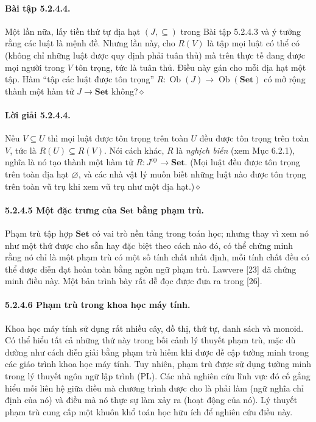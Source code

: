 \paragraph{Bài tập 5.2.4.4.} Một lần nữa, lấy tiền thứ tự địa hạt $(J,\subseteq)$ trong Bài tập 5.2.4.3 và ý tưởng rằng các luật là mệnh đề. Nhưng lần này, cho $R(V)$ là tập mọi luật có thể có (không chỉ những luật được quy định phải tuân thủ) mà trên thực tế đang được mọi người trong $V$ tôn trọng, tức là tuân thủ. Điều này gán cho mỗi địa hạt một tập. Hàm ``tập các luật được tôn trọng'' $R:\operatorname{Ob}(J)\to\operatorname{Ob}(\mathbf{Set})$ có mở rộng thành một hàm tử $J\to\mathbf{Set}$ không?\hfill$\diamond$
\paragraph{Lời giải 5.2.4.4.} Nếu $V\subseteq U$ thì mọi luật được tôn trọng trên toàn $U$ đều được tôn trọng trên toàn $V$, tức là $R(U)\subseteq R(V)$. Nói cách khác, $R$ là \emph{nghịch biến} (xem Mục 6.2.1), nghĩa là nó tạo thành một hàm tử $R:J^{\mathrm{op}}\to\mathbf{Set}$. (Mọi luật đều được tôn trọng trên toàn địa hạt $\varnothing$, và các nhà vật lý muốn biết những luật nào được tôn trọng trên toàn vũ trụ khi xem vũ trụ như một địa hạt.)\hfill$\diamond$
\paragraph{5.2.4.5 Một đặc trưng của $\mathbf{Set}$ bằng phạm trù.} Phạm trù tập hợp $\mathbf{Set}$ có vai trò nền tảng trong toán học; nhưng thay vì xem nó như một thứ được cho sẵn hay đặc biệt theo cách nào đó, có thể chứng minh rằng nó chỉ là một phạm trù có một số tính chất nhất định, mỗi tính chất đều có thể được diễn đạt hoàn toàn bằng ngôn ngữ phạm trù. Lawvere [23] đã chứng minh điều này. Một bản trình bày rất dễ đọc được đưa ra trong [26].
\paragraph{5.2.4.6 Phạm trù trong khoa học máy tính.} Khoa học máy tính sử dụng rất nhiều cây, đồ thị, thứ tự, danh sách và monoid. Có thể hiểu tất cả những thứ này trong bối cảnh lý thuyết phạm trù, mặc dù dường như cách diễn giải bằng phạm trù hiếm khi được đề cập tường minh trong các giáo trình khoa học máy tính. Tuy nhiên,
phạm trù được sử dụng tường minh trong lý thuyết ngôn ngữ lập trình (PL). Các nhà nghiên cứu lĩnh vực đó cố gắng hiểu mối liên hệ giữa điều mà chương trình được cho là phải làm (ngữ nghĩa chỉ định của nó) và điều mà nó thực sự làm xảy ra (hoạt động của nó). Lý thuyết phạm trù cung cấp một khuôn khổ toán học hữu ích để nghiên cứu điều này.

